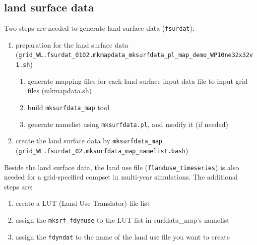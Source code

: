 \documentclass[journal abbreviation, manuscript]{copernicus}
\begin{document}
\subsection{land surface data}
Two steps are needed to generate land surface data (\verb|fsurdat|):
\begin{enumerate}
\item preparation for the land surface data (\lstinline|grid_WL.fsurdat_0102.mkmapdata_mksurfdata_pl_map_demo_WP10ne32x32v1.sh|)
	\begin{enumerate}[label*=\arabic*.]
	\item generate mapping files for each land surface input data file to input grid files (mkmapdata.sh)
	\item build \verb|mksurfdata_map| tool
	\item generate namelist using \verb|mksurfdata.pl|, and modify it (if needed)
	\end{enumerate}
\item create the land surface data by \verb|mksurfdata_map| (\lstinline|grid_WL.fsurdat_02.mksurfdata_map_namelist.bash|)
\end{enumerate}
\vspace{\baselineskip}

Beside the land surface data, the land use file (\verb|flanduse_timeseries|) is also needed for a grid-specified compset in multi-year simulations. The additional steps are:
\begin{enumerate}
  \item create a LUT (Land Use Translator) file list
  \item assign the \verb|mksrf_fdynuse| to the LUT list in surfdata\_map's namelist
  \item assign the \verb|fdyndat| to the name of the land use file you want to create
\end{enumerate}
\vspace{\baselineskip}
\end{document}
